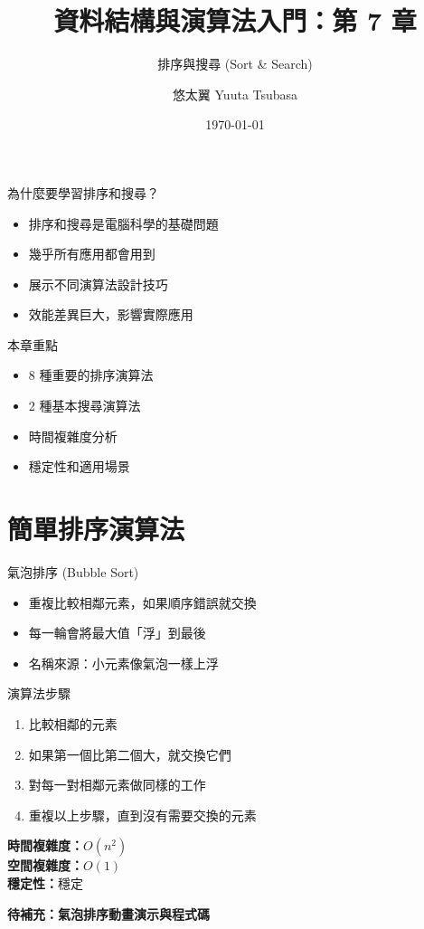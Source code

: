 \documentclass{beamer}
\begin{document}
\title{資料結構與演算法入門：第 7 章}
\subtitle{排序與搜尋 (Sort \& Search)}
\author{悠太翼 Yuuta Tsubasa}
\date{\today}

\frame{\titlepage}

\begin{frame}{為什麼要學習排序和搜尋？}
\begin{itemize}
    \item 排序和搜尋是電腦科學的基礎問題
    \item 幾乎所有應用都會用到
    \item 展示不同演算法設計技巧
    \item 效能差異巨大，影響實際應用
\end{itemize}

\vspace{1em}
\begin{block}{本章重點}
\begin{itemize}
    \item 8 種重要的排序演算法
    \item 2 種基本搜尋演算法
    \item 時間複雜度分析
    \item 穩定性和適用場景
\end{itemize}
\end{block}
\end{frame}

\section{簡單排序演算法}

\begin{frame}{氣泡排序 (Bubble Sort)}
\begin{itemize}
    \item 重複比較相鄰元素，如果順序錯誤就交換
    \item 每一輪會將最大值「浮」到最後
    \item 名稱來源：小元素像氣泡一樣上浮
\end{itemize}

\vspace{1em}
\begin{block}{演算法步驟}
\begin{enumerate}
    \item 比較相鄰的元素
    \item 如果第一個比第二個大，就交換它們
    \item 對每一對相鄰元素做同樣的工作
    \item 重複以上步驟，直到沒有需要交換的元素
\end{enumerate}
\end{block}

\vspace{1em}
\textbf{時間複雜度：}$O(n^2)$\\
\textbf{空間複雜度：}$O(1)$\\
\textbf{穩定性：}穩定

\vspace{1em}
\textbf{待補充：氣泡排序動畫演示與程式碼}
\end{frame}
\end{document}
